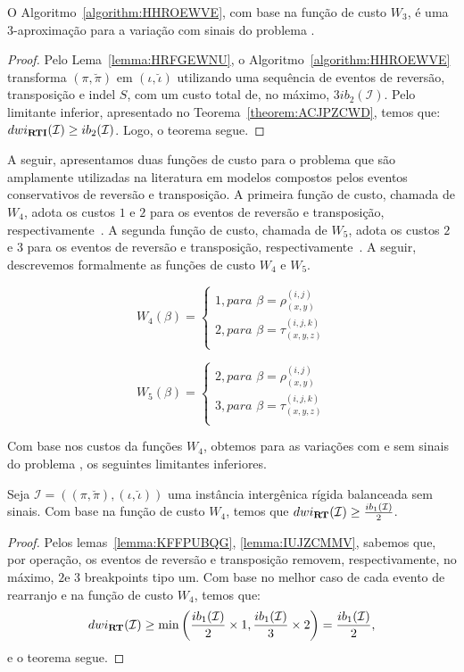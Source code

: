 \begin{theorem}\label{theorem:UMSMTVTN}
O Algoritmo~\ref{algorithm:HHROEWVE}, com base na função de custo $W_3$, é uma $3$-aproximação para a variação com sinais do problema \SbWIRTI{}.
\end{theorem}
\begin{proof}
Pelo Lema~\ref{lemma:HRFGEWNU}, o Algoritmo~\ref{algorithm:HHROEWVE} transforma $(\pi,\breve\pi)$ em $(\iota,\breve\iota)$ utilizando uma sequência de eventos de reversão, transposição e indel $S$, com um custo total de, no máximo, $3ib_2(\mathcal{I})$. Pelo limitante inferior, apresentado no Teorema~\ref{theorem:ACJPZCWD}, temos que: $dwi_{\textbf{RTI}}(\mathcal{I}) \ge ib_2(\mathcal{I})$. Logo, o teorema segue.
\end{proof}

A seguir, apresentamos duas funções de custo para o problema \SbWIRT{} que são amplamente utilizadas na literatura em modelos compostos pelos eventos conservativos de reversão e transposição. A primeira função de custo, chamada de $W_4$, adota os custos $1$ e $2$ para os eventos de reversão e transposição, respectivamente~\cite{2002-eriksen}. A segunda função de custo, chamada de $W_5$, adota os custos $2$ e $3$ para os eventos de reversão e transposição, respectivamente~\cite{2019a-oliveira-etal}. A seguir, descrevemos formalmente as funções de custo $W_4$ e $W_5$.

$$
  W_4(\beta) = \begin{cases}
      1, \textit{para } \beta = \rho_{(x,y)}^{(i,j)} \\
      2, \textit{para } \beta = \tau_{(x,y,z)}^{(i,j,k)} \\
  \end{cases}
$$ 

$$
  W_5(\beta) = \begin{cases}
      2, \textit{para } \beta = \rho_{(x,y)}^{(i,j)} \\
      3, \textit{para } \beta = \tau_{(x,y,z)}^{(i,j,k)} \\
  \end{cases}
$$

Com base nos custos da funções $W_4$, obtemos para as variações com e sem sinais do problema \SbWIRT{}, os seguintes limitantes inferiores.

\begin{theorem}\label{theorem:TUSWAWTT}
Seja $\mathcal{I} = ((\pi,\breve\pi),(\iota,\breve\iota))$ uma instância intergênica rígida balanceada sem sinais. Com base na função de custo $W_4$, temos que $dwi_{\textbf{RT}}(\mathcal{I}) \ge \frac{ib_1(\mathcal{I})}{2}$.
\begin{proof}
Pelos lemas~\ref{lemma:KFFPUBQG}, \ref{lemma:IUJZCMMV}, sabemos que, por operação, os eventos de reversão e transposição removem, respectivamente, no máximo, $2$e $3$ breakpoints tipo um. Com base no melhor caso de cada evento de rearranjo e na função de custo $W_4$, temos que:
$$dwi_{\textbf{RT}}(\mathcal{I}) \ge \min\left(\frac{ib_1(\mathcal{I})}{2} \times 1,\frac{ib_1(\mathcal{I})}{3} \times 2\right) = \frac{ib_1(\mathcal{I})}{2},$$ e o teorema segue.
\end{proof}
\end{theorem}

